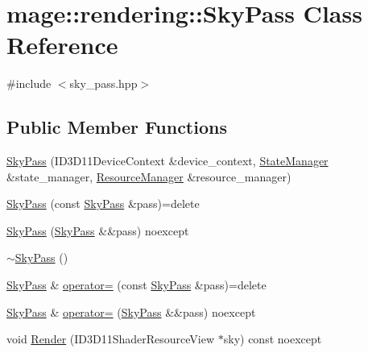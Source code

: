 \hypertarget{classmage_1_1rendering_1_1_sky_pass}{}\section{mage\+:\+:rendering\+:\+:Sky\+Pass Class Reference}
\label{classmage_1_1rendering_1_1_sky_pass}


{\ttfamily \#include $<$sky\+\_\+pass.\+hpp$>$}

\subsection*{Public Member Functions}
\begin{DoxyCompactItemize}
\item 
\mbox{\hyperlink{classmage_1_1rendering_1_1_sky_pass_a55e8ef167a1e70a88a4be1fd11aed70e}{Sky\+Pass}} (I\+D3\+D11\+Device\+Context \&device\+\_\+context, \mbox{\hyperlink{classmage_1_1rendering_1_1_state_manager}{State\+Manager}} \&state\+\_\+manager, \mbox{\hyperlink{classmage_1_1rendering_1_1_resource_manager}{Resource\+Manager}} \&resource\+\_\+manager)
\item 
\mbox{\hyperlink{classmage_1_1rendering_1_1_sky_pass_a684fba31f92c43b717029d929303db2e}{Sky\+Pass}} (const \mbox{\hyperlink{classmage_1_1rendering_1_1_sky_pass}{Sky\+Pass}} \&pass)=delete
\item 
\mbox{\hyperlink{classmage_1_1rendering_1_1_sky_pass_a2d9489936058c463743bd437fb0cbb3e}{Sky\+Pass}} (\mbox{\hyperlink{classmage_1_1rendering_1_1_sky_pass}{Sky\+Pass}} \&\&pass) noexcept
\item 
\mbox{\hyperlink{classmage_1_1rendering_1_1_sky_pass_a99473ca11c0c25ab0608a3f93cf30aa6}{$\sim$\+Sky\+Pass}} ()
\item 
\mbox{\hyperlink{classmage_1_1rendering_1_1_sky_pass}{Sky\+Pass}} \& \mbox{\hyperlink{classmage_1_1rendering_1_1_sky_pass_a8364836c5db0dc3e9894e1749ab302e8}{operator=}} (const \mbox{\hyperlink{classmage_1_1rendering_1_1_sky_pass}{Sky\+Pass}} \&pass)=delete
\item 
\mbox{\hyperlink{classmage_1_1rendering_1_1_sky_pass}{Sky\+Pass}} \& \mbox{\hyperlink{classmage_1_1rendering_1_1_sky_pass_ad844a754a13fa90ef87aa62745ea936d}{operator=}} (\mbox{\hyperlink{classmage_1_1rendering_1_1_sky_pass}{Sky\+Pass}} \&\&pass) noexcept
\item 
void \mbox{\hyperlink{classmage_1_1rendering_1_1_sky_pass_a94b9ca7b1a02b6f6730584ec80adb84a}{Render}} (I\+D3\+D11\+Shader\+Resource\+View $\ast$sky) const noexcept
\end{DoxyCompactItemize}
